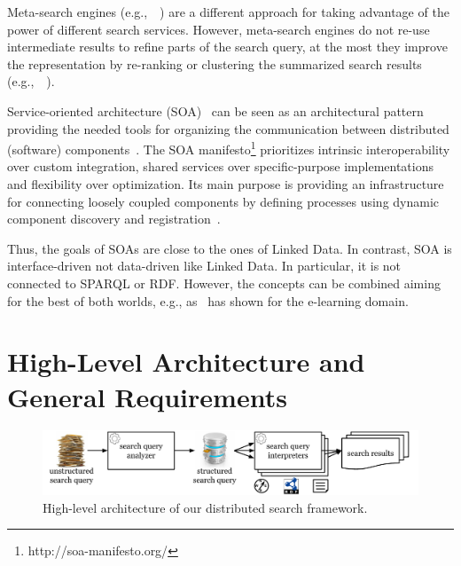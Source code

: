 \documentclass{acm_proc_article-sp}
\newcommand{\eg}{e.g.,~}
\begin{document}
Meta-search engines (\eg~\cite{liebel2004harvester,gulli2005building}) are a different approach for taking advantage of the power of different search services.
However, meta-search engines do not re-use intermediate results to refine parts of the search query, at the most they improve the representation by re-ranking or clustering the summarized search results (\eg~\cite{carpineto10metasearchclustering}).

Service-oriented architecture (SOA)~\cite{Gartner96,OASIS06} can be seen as an architectural pattern providing the needed tools for organizing the communication between distributed (software) components~\cite{bell2009soa}.
The SOA manifesto\footnote{http://soa-manifesto.org/} prioritizes intrinsic interoperability over custom integration, shared services over specific-purpose implementations and flexibility over optimization. 
Its main purpose is providing an infrastructure for connecting loosely coupled components by defining processes using dynamic component discovery and registration~\cite{erl2008soa}.

Thus, the goals of SOAs are close to the ones of Linked Data.
In contrast, SOA is interface-driven not data-driven like Linked Data. 
In particular, it is not connected to SPARQL or RDF.
However, the concepts can be combined aiming for the best of both worlds, e.g., as~\cite{yu2011linked} has shown for the e-learning domain.



\section{High-Level Architecture and \\General Requirements}\label{sec:architecture}
\begin{figure}[t]
\centering
\includegraphics[width=\textwidth]{highlevelarchitecture2}
\caption{High-level architecture of our distributed search framework.}
\label{fig:highlevelarchitecture}
\end{figure}
\end{document}
